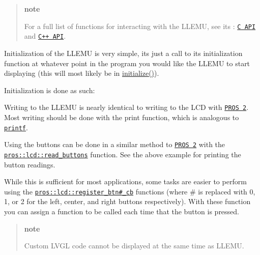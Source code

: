 \begin{quote}
{\bfseries note}

For a full list of functions for interacting with the L\+L\+E\+MU, see its \+: \href{../../api/c/llemu.html}{\tt C A\+PI} and \href{../../api/cpp/llemu.html}{\tt C++ A\+PI}. \end{quote}


Initialization of the L\+L\+E\+MU is very simple, it\textquotesingle{}s just a call to its initialization function at whatever point in the program you would like the L\+L\+E\+MU to start displaying (this will most likely be in {\ttfamily \hyperlink{main_8h_a9efe22aaead3a5e936b5df459de02eba}{initialize()}}).

Initialization is done as such\+:

Writing to the L\+L\+E\+MU is nearly identical to writing to the L\+CD with \href{../../cortex/tutorials/lcd.html}{\tt P\+R\+OS 2}. Most writing should be done with the print function, which is analogous to \href{http://www.cplusplus.com/reference/cstdio/printf/}{\tt printf}.

Using the buttons can be done in a similar method to \href{../../../cortex/tutorials/lcd.html}{\tt P\+R\+OS 2} with the \href{../../api/cpp/llemu.html#read-buttons}{\tt pros\+::lcd\+::read\+\_\+buttons} function. See the above example for printing the button readings.

While this is sufficient for most applications, some tasks are easier to perform using the \href{../../api/cpp/llemu.html#register-btn0-cb}{\tt pros\+::lcd\+::register\+\_\+btn\#\+\_\+cb} functions (where \# is replaced with 0, 1, or 2 for the left, center, and right buttons respectively). With these function you can assign a function to be called each time that the button is pressed.

\begin{quote}
{\bfseries note}

Custom L\+V\+GL code cannot be displayed at the same time as L\+L\+E\+MU.\end{quote}
